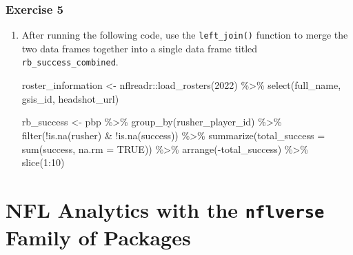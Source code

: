 \documentclass[
  letterpaper,
]{krantz}
\newenvironment{Shaded}{\begin{snugshade}}{\end{snugshade}}
\newcommand{\AttributeTok}[1]{\textcolor[rgb]{0.40,0.45,0.13}{#1}}
\newcommand{\ConstantTok}[1]{\textcolor[rgb]{0.56,0.35,0.01}{#1}}
\newcommand{\DecValTok}[1]{\textcolor[rgb]{0.68,0.00,0.00}{#1}}
\newcommand{\FunctionTok}[1]{\textcolor[rgb]{0.28,0.35,0.67}{#1}}
\newcommand{\NormalTok}[1]{\textcolor[rgb]{0.00,0.23,0.31}{#1}}
\newcommand{\OtherTok}[1]{\textcolor[rgb]{0.00,0.23,0.31}{#1}}
\newcommand{\SpecialCharTok}[1]{\textcolor[rgb]{0.37,0.37,0.37}{#1}}
\begin{document}
\hypertarget{exercise-5}{%
\subsection{\texorpdfstring{\textbf{Exercise
5}}{Exercise 5}}\label{exercise-5}}

\begin{enumerate}
\def\labelenumi{\arabic{enumi}.}
\item
  After running the following code, use the \texttt{left\_join()}
  function to merge the two data frames together into a single data
  frame titled \texttt{rb\_success\_combined}.

\begin{Shaded}
\begin{Highlighting}[]
\NormalTok{roster\_information }\OtherTok{\textless{}{-}}\NormalTok{ nflreadr}\SpecialCharTok{::}\FunctionTok{load\_rosters}\NormalTok{(}\DecValTok{2022}\NormalTok{) }\SpecialCharTok{\%\textgreater{}\%}
  \FunctionTok{select}\NormalTok{(full\_name, gsis\_id, headshot\_url)}

\NormalTok{rb\_success }\OtherTok{\textless{}{-}}\NormalTok{ pbp }\SpecialCharTok{\%\textgreater{}\%}
  \FunctionTok{group\_by}\NormalTok{(rusher\_player\_id) }\SpecialCharTok{\%\textgreater{}\%}
  \FunctionTok{filter}\NormalTok{(}\SpecialCharTok{!}\FunctionTok{is.na}\NormalTok{(rusher) }\SpecialCharTok{\&} \SpecialCharTok{!}\FunctionTok{is.na}\NormalTok{(success)) }\SpecialCharTok{\%\textgreater{}\%}
  \FunctionTok{summarize}\NormalTok{(}\AttributeTok{total\_success =} \FunctionTok{sum}\NormalTok{(success, }\AttributeTok{na.rm =} \ConstantTok{TRUE}\NormalTok{)) }\SpecialCharTok{\%\textgreater{}\%}
  \FunctionTok{arrange}\NormalTok{(}\SpecialCharTok{{-}}\NormalTok{total\_success) }\SpecialCharTok{\%\textgreater{}\%}
  \FunctionTok{slice}\NormalTok{(}\DecValTok{1}\SpecialCharTok{:}\DecValTok{10}\NormalTok{)}
\end{Highlighting}
\end{Shaded}
\end{enumerate}


\hypertarget{nfl-analytics-with-the-nflverse-family-of-packages}{%
\chapter{\texorpdfstring{NFL Analytics with the \texttt{nflverse} Family
of
Packages}{NFL Analytics with the nflverse Family of Packages}}\label{nfl-analytics-with-the-nflverse-family-of-packages}}
\end{document}
